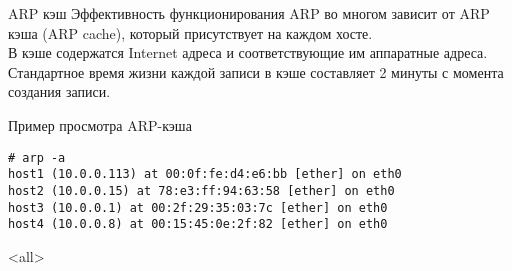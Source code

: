 \begin{frame}{ARP кэш}
	Эффективность функционирования ARP во многом зависит от ARP кэша (ARP cache),  который присутствует на каждом хосте.\\
	В кэше содержатся Internet адреса и соответствующие им аппаратные адреса.\\
	Стандартное время жизни каждой записи в кэше составляет 2 минуты с момента создания записи.
\end{frame}

\begin{frame}[fragile]{Пример просмотра ARP-кэша}
\scriptsize
	\begin{verbatim}
# arp -a
host1 (10.0.0.113) at 00:0f:fe:d4:e6:bb [ether] on eth0
host2 (10.0.0.15) at 78:e3:ff:94:63:58 [ether] on eth0
host3 (10.0.0.1) at 00:2f:29:35:03:7c [ether] on eth0
host4 (10.0.0.8) at 00:15:45:0e:2f:82 [ether] on eth0
	\end{verbatim}
\normalsize
\end{frame}

\mode<all>{}


